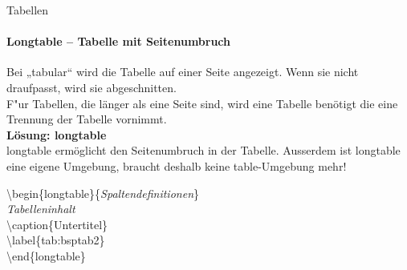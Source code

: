 \begin{frame}{Tabellen}
\framesubtitle{Longtable -- Tabelle mit Seitenumbruch}
\bigskip
Bei „tabular“ wird die Tabelle auf einer Seite angezeigt. Wenn sie nicht draufpasst, wird sie abgeschnitten.\\
F"ur Tabellen, die länger als eine Seite sind, wird eine Tabelle benötigt die eine Trennung der Tabelle vornimmt.\\
\textbf{Lösung: {\ttfamily longtable}}\\
{\ttfamily longtable} ermöglicht den Seitenumbruch in der Tabelle. Ausserdem ist {\ttfamily longtable} eine eigene Umgebung, braucht deshalb keine {\ttfamily table}-Umgebung mehr!\\[3mm]

\begin{ttfamily}
\color{unibablueI}\textbackslash begin\color{black}\{longtable\}\{\textit{Spaltendefinitionen}\}\\
\textit{Tabelleninhalt}\\
\color{nounibaredI}\textbackslash caption\color{black}\{Untertitel\}\\
\color{nounibaredI}\textbackslash label\color{black}\{tab:bsptab2\}\\
\color{unibablueI}\textbackslash end\color{black}\{longtable\}
\end{ttfamily}
\end{frame}
